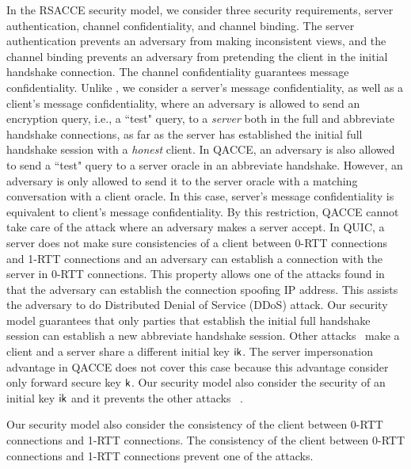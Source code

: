 In the RSACCE security model, we consider three security requirements,
server authentication, channel confidentiality, and channel binding.
The server authentication prevents an adversary from making inconsistent views,
and the channel  binding prevents an adversary from pretending the client in the initial handshake connection.
The channel confidentiality guarantees message confidentiality.
Unlike \cite{KPW13:SACCE,FG14:QUIC,LJBN15:QUIC},
we consider a server's message confidentiality, as well as a client's message
confidentiality, where an adversary is allowed to send
an encryption query, i.e., a ``test" query, to a \textit{server}
both in the full and abbreviate handshake connections,
as far as the server has established the initial full handshake session with a \textit{honest} client.
In QACCE, an adversary
is also allowed to send a ``test" query to a server oracle in an
abbreviate handshake.
However, an adversary is only allowed
to send it to the server oracle with a matching
conversation with a client oracle.
In this case, server's message confidentiality is
equivalent to client's message confidentiality.
By this restriction, QACCE cannot take care of the attack where
an adversary makes a server accept.
In QUIC, a server does not make sure consistencies of a client
between 0-RTT connections and 1-RTT connections and
an adversary can establish a connection with the server in 0-RTT connections.
This property allows one of the attacks found in~\cite{LJBN15:QUIC} that
the adversary can establish the connection spoofing IP address.
This assists the adversary to do Distributed Denial of Service
(DDoS) attack.
Our security model guarantees that only parties
that establish the initial full handshake session can
establish a new abbreviate handshake session.
Other attacks~\cite{LJBN15:QUIC} make a client and a server share
a different initial key $\mathsf{ik}$.
The server impersonation advantage in QACCE does not
cover this case because this advantage consider only forward
secure key $\mathsf{k}$.
Our security model also consider the security of an initial
key $\mathsf{ik}$ and it prevents the other attacks
~\cite{LJBN15:QUIC}.
\fi

Our security model also consider the consistency of the client between
0-RTT connections and 1-RTT connections.
The consistency of the client between 0-RTT connections
and 1-RTT connections prevent one of the attacks.

